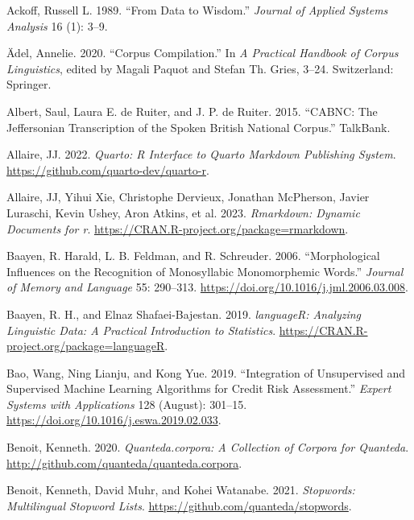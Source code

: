 \documentclass[
  letterpaper,
  DIV=11,
  numbers=noendperiod]{scrreport}
\newlength{\cslhangindent}
\newlength{\cslentryspacingunit} %
\newenvironment{CSLReferences}[2] %
 {%
  \setlength{\parindent}{0pt}
  \ifodd #1
  \let\oldpar\par
  \def\par{\hangindent=\cslhangindent\oldpar}
  \fi
  \setlength{\parskip}{#2\cslentryspacingunit}
 }%
 {}
\theoremstyle{definition}
\theoremstyle{remark}
\begin{document}
\hypertarget{refs}{}
\begin{CSLReferences}{1}{0}
\leavevmode{}%
Ackoff, Russell L. 1989. {``From Data to Wisdom.''} \emph{Journal of
Applied Systems Analysis} 16 (1): 3--9.

\leavevmode{}%
Ädel, Annelie. 2020. {``Corpus Compilation.''} In \emph{A Practical
Handbook of Corpus Linguistics}, edited by Magali Paquot and Stefan Th.
Gries, 3--24. Switzerland: Springer.

\leavevmode{}%
Albert, Saul, Laura E. de Ruiter, and J. P. de Ruiter. 2015. {``CABNC:
The Jeffersonian Transcription of the Spoken British National Corpus.''}
TalkBank.

\leavevmode{}%
Allaire, JJ. 2022. \emph{Quarto: R Interface to Quarto Markdown
Publishing System}. \url{https://github.com/quarto-dev/quarto-r}.

\leavevmode{}%
Allaire, JJ, Yihui Xie, Christophe Dervieux, Jonathan McPherson, Javier
Luraschi, Kevin Ushey, Aron Atkins, et al. 2023. \emph{Rmarkdown:
Dynamic Documents for r}.
\url{https://CRAN.R-project.org/package=rmarkdown}.

\leavevmode{}%
Baayen, R. Harald, L. B. Feldman, and R. Schreuder. 2006.
{``Morphological Influences on the Recognition of Monosyllabic
Monomorphemic Words.''} \emph{Journal of Memory and Language} 55:
290--313. \url{https://doi.org/10.1016/j.jml.2006.03.008}.

\leavevmode{}%
Baayen, R. H., and Elnaz Shafaei-Bajestan. 2019. \emph{languageR:
Analyzing Linguistic Data: A Practical Introduction to Statistics}.
\url{https://CRAN.R-project.org/package=languageR}.

\leavevmode{}%
Bao, Wang, Ning Lianju, and Kong Yue. 2019. {``Integration of
Unsupervised and Supervised Machine Learning Algorithms for Credit Risk
Assessment.''} \emph{Expert Systems with Applications} 128 (August):
301--15. \url{https://doi.org/10.1016/j.eswa.2019.02.033}.

\leavevmode{}%
Benoit, Kenneth. 2020. \emph{Quanteda.corpora: A Collection of Corpora
for Quanteda}. \url{http://github.com/quanteda/quanteda.corpora}.

\leavevmode{}%
Benoit, Kenneth, David Muhr, and Kohei Watanabe. 2021. \emph{Stopwords:
Multilingual Stopword Lists}.
\url{https://github.com/quanteda/stopwords}.


\end{CSLReferences}
\end{document}
